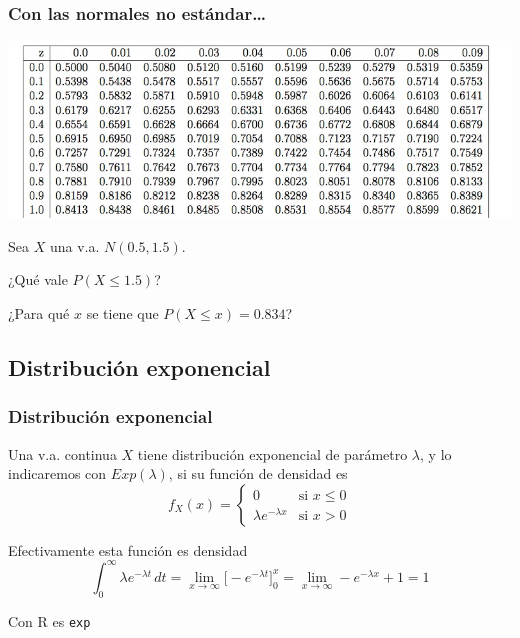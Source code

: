 \documentclass[handout]{beamer}\usepackage[]{graphicx}\usepackage[]{color}
\renewcommand{\emph}[1]{{\color{red}#1}}
\renewcommand{\leq}{\leqslant}
\theoremstyle{plain}
\theoremstyle{definition}
\begin{document}
\begin{frame}
\frametitle{Con las normales no estándar\ldots}
\vspace*{-1cm}

\begin{center}
\hspace*{-0.4cm}\includegraphics[width=1.1\linewidth]{tabla.jpg}
\end{center}

Sea $X$ una v.a. $N(0.5,1.5)$. \medskip

¿Qué vale $P(X\leq 1.5)$? \medskip

¿Para qué  $x$ se tiene  que $P(X\leq x)=0.834$?



\end{frame}




\subsection{Distribución exponencial}

\begin{frame}[fragile]
\frametitle{Distribución exponencial}
Una v.a. continua $X$ tiene \emph{distribución exponencial} de  parámetro $\lambda$,  y lo  indicaremos con   \emph{$Exp(\lambda)$}, si su  función de densidad es
 $$
 f_X(x)=
 \left\{\begin{array}{ll}
0 & \mbox{si } x\leq 0\\[2ex] \lambda e^{-\lambda x}  & \mbox{si $x>0$}
\end{array}
\right. $$ 

Efectivamente esta función es densidad
$$
\int_0^\infty  \lambda e^{-\lambda t}\,dt=\lim_{x\to\infty}\Big[-e^{-\lambda t}\Big]_0^x=\lim_{x\to\infty}-e^{-\lambda x}+1=1
$$

Con  R es \texttt{exp}


\end{frame}
\end{document}
